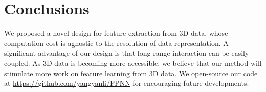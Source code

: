 \section{Conclusions}
\label{sec:conclusions}

\vspace{-0.2cm}

We proposed a novel design for feature extraction from 3D data, whose computation cost is agnostic to the resolution of data representation. A significant advantage of our design is that long range interaction can be easily coupled. As 3D data is becoming more accessible, we believe that our method will stimulate more work on feature learning from 3D data. We open-source our code at \url{https://github.com/yangyanli/FPNN} for encouraging future developments.